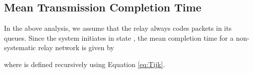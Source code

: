 	



\subsection{Mean Transmission Completion Time}

In the above analysis, we assume that the relay always codes packets in its queues. Since the system initiates in state , the mean completion time for a non-systematic relay network is given by

where  is defined recursively using Equation \eqref{eq:Tijk}. 